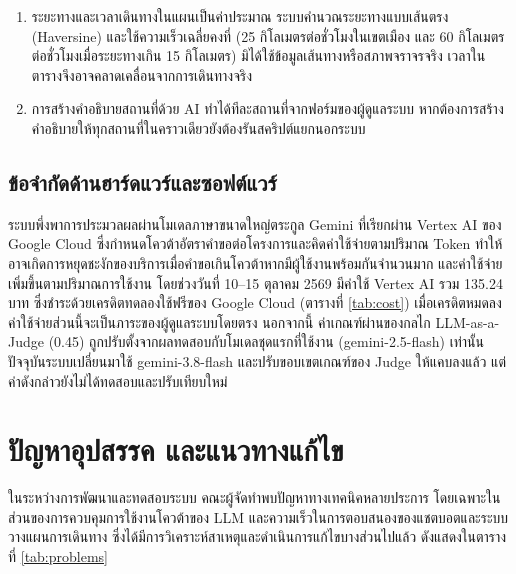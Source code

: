 \begin{enumerate}[label=(\arabic*),leftmargin=0pt,itemindent=\dimexpr\parindent+\parenlabelwidth+1em\relax,align=right,labelwidth=\parenlabelwidth,labelsep=1em]
\item ระยะทางและเวลาเดินทางในแผนเป็นค่าประมาณ ระบบคำนวณระยะทางแบบเส้นตรง (Haversine) และใช้ความเร็วเฉลี่ยคงที่ (25 กิโลเมตรต่อชั่วโมงในเขตเมือง และ 60 กิโลเมตรต่อชั่วโมงเมื่อระยะทางเกิน 15 กิโลเมตร) มิได้ใช้ข้อมูลเส้นทางหรือสภาพจราจรจริง เวลาในตารางจึงอาจคลาดเคลื่อนจากการเดินทางจริง
\item การสร้างคำอธิบายสถานที่ด้วย AI ทำได้ทีละสถานที่จากฟอร์มของผู้ดูแลระบบ หากต้องการสร้างคำอธิบายให้ทุกสถานที่ในคราวเดียวยังต้องรันสคริปต์แยกนอกระบบ
\end{enumerate}

\subsection{ข้อจำกัดด้านฮาร์ดแวร์และซอฟต์แวร์}

ระบบพึ่งพาการประมวลผลผ่านโมเดลภาษาขนาดใหญ่ตระกูล Gemini ที่เรียกผ่าน Vertex AI ของ Google Cloud ซึ่งกำหนดโควต้าอัตราคำขอต่อโครงการและคิดค่าใช้จ่ายตามปริมาณ Token ทำให้อาจเกิดการหยุดชะงักของบริการเมื่อคำขอเกินโควต้าหากมีผู้ใช้งานพร้อมกันจำนวนมาก และค่าใช้จ่ายเพิ่มขึ้นตามปริมาณการใช้งาน โดยช่วงวันที่ 10--15 ตุลาคม 2569 มีค่าใช้ Vertex AI รวม 135.24 บาท ซึ่งชำระด้วยเครดิตทดลองใช้ฟรีของ Google Cloud (ตารางที่ \ref{tab:cost}) เมื่อเครดิตหมดลงค่าใช้จ่ายส่วนนี้จะเป็นภาระของผู้ดูแลระบบโดยตรง นอกจากนี้ ค่าเกณฑ์ผ่านของกลไก LLM-as-a-Judge (0.45) ถูกปรับตั้งจากผลทดสอบกับโมเดลชุดแรกที่ใช้งาน (gemini-2.5-flash) เท่านั้น ปัจจุบันระบบเปลี่ยนมาใช้ gemini-3.8-flash และปรับขอบเขตเกณฑ์ของ Judge ให้แคบลงแล้ว แต่ค่าดังกล่าวยังไม่ได้ทดสอบและปรับเทียบใหม่

\section{ปัญหาอุปสรรค และแนวทางแก้ไข}

ในระหว่างการพัฒนาและทดสอบระบบ คณะผู้จัดทำพบปัญหาทางเทคนิคหลายประการ โดยเฉพาะในส่วนของการควบคุมการใช้งานโควต้าของ LLM และความเร็วในการตอบสนองของแชตบอตและระบบวางแผนการเดินทาง ซึ่งได้มีการวิเคราะห์สาเหตุและดำเนินการแก้ไขบางส่วนไปแล้ว ดังแสดงในตารางที่ \ref{tab:problems}

